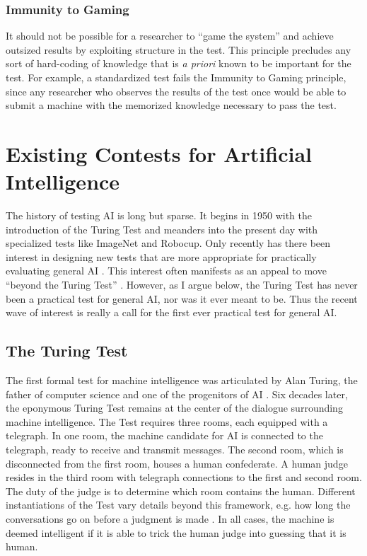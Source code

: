 \subsubsection{Immunity to Gaming}
It should not be possible for a researcher to ``game the system'' and achieve outsized results by exploiting structure in the test. This principle precludes any sort of hard-coding of knowledge that is \textit{a priori} known to be important for the test. For example, a standardized test fails the Immunity to Gaming principle, since any researcher who observes the results of the test once would be able to submit a machine with the memorized knowledge necessary to pass the test. 

\section{Existing Contests for Artificial Intelligence}

The history of testing AI is long but sparse. It begins in 1950 with the introduction of the Turing Test and meanders into the present day with specialized tests like ImageNet and Robocup. Only recently has there been interest in designing new tests that are more appropriate for practically evaluating general AI \cite{you15}. This interest often manifests as an appeal to move ``beyond the Turing Test'' \cite{marcus14}. However, as I argue below, the Turing Test has never been a practical test for general AI, nor was it ever meant to be. Thus the recent wave of interest is really a call for the first ever practical test for general AI.

\subsection{The Turing Test}

The first formal test for machine intelligence was articulated by Alan Turing, the father of computer science and one of the progenitors of AI \cite{turing50}. Six decades later, the eponymous Turing Test remains at the center of the dialogue surrounding machine intelligence. The Test requires three rooms, each equipped with a telegraph. In one room, the machine candidate for AI is connected to the telegraph, ready to receive and transmit messages. The second room, which is disconnected from the first room, houses a human confederate. A human judge resides in the third room with telegraph connections to the first and second room. The duty of the judge is to determine which room contains the human. Different instantiations of the Test vary details beyond this framework, e.g. how long the conversations go on before a judgment is made \cite{loebner03}. In all cases, the machine is deemed intelligent if it is able to trick the human judge into guessing that it is human.

